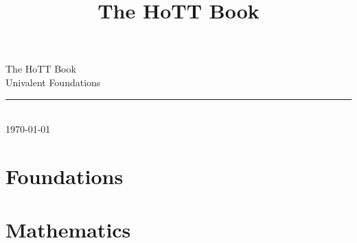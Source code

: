 \documentclass[openany,11pt]{book}
\begin{document}
\title{The HoTT Book}


%
\thispagestyle{empty}%

\vspace*{0.2\textheight}

\centering
{\color{red!80!black}\fontsize{60}{100}\selectfont The HoTT Book}\\[2\baselineskip]
{\fontsize{40}{50}\selectfont Univalent Foundations}
\vfill
\rule{0.4\textwidth}{3pt}\\[\baselineskip]
{\fontsize{25}{30}\selectfont\today}
\vspace*{0.1\textheight}

\clearpage
\restoregeometry



\tableofcontents



\part{Foundations}





%









\part{Mathematics}










%

%



\end{document}
